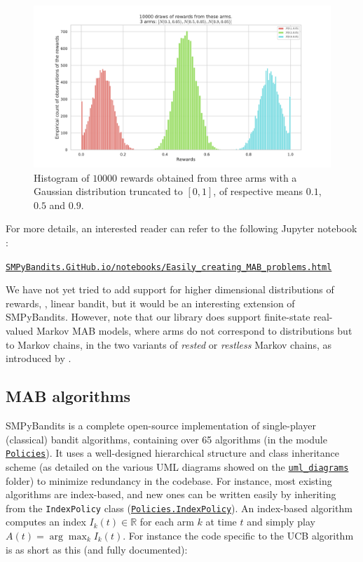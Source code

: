 \begin{figure}[h!]  %
	\centering
	\includegraphics[width=0.75\linewidth]{exampleOfRewards.pdf}
	\caption{Histogram of $10000$ \iid{} rewards obtained from three arms with a Gaussian distribution truncated to $[0,1]$, of respective means $0.1$, $0.5$ and $0.9$.}
	\label{fig:3:exampleOfRewards}
\end{figure}

For more details, an interested reader can refer to the following Jupyter notebook \cite{jupyter}:
\begin{small}
    \href{https://smpybandits.github.io/notebooks/Easily_creating_MAB_problems.html}{\texttt{SMPyBandits.GitHub.io/notebooks/Easily\_creating\_MAB\_problems.html}}
\end{small}

We have not yet tried to add support for higher dimensional distributions of rewards, \eg, linear bandit, but it would be an interesting extension of SMPyBandits.
%
However, note that our library does support finite-state real-valued Markov MAB models, where arms do not correspond to distributions but to Markov chains, in the two variants of \emph{rested} or \emph{restless} Markov chains, as introduced by \cite{Anantharam87b}.

\subsection{MAB algorithms}

SMPyBandits is a complete open-source implementation of single-player (classical) bandit algorithms,
containing over 65 algorithms (in the module \texttt{\href{https://SMPyBandits.GitHub.io/docs/Policies.html}{Policies}}).
It uses a well-designed hierarchical structure and class inheritance scheme (as detailed on the various UML diagrams showed on the \texttt{\href{https://SMPyBandits.GitHub.io/uml_diagrams/README.html}{uml\_diagrams}} folder) to minimize redundancy in the codebase.
For instance, most existing algorithms are index-based, and new ones can be written easily by inheriting from the \texttt{IndexPolicy} class (\texttt{\href{https://SMPyBandits.GitHub.io/docs/Policies.IndexPolicy.html}{Policies.IndexPolicy}}).
An index-based algorithm computes an index $I_k(t)\in\mathbb{R}$ for each arm $k$ at time $t$ and simply play $A(t) = \arg\max_k I_k(t)$.
For instance the code specific to the UCB algorithm \cite{LaiRobbins85,Auer02} is as short as this (and fully documented):

